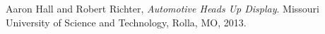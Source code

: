 \begin{thebibliography}{9}

	Aaron Hall and Robert Richter,
	\emph{Automotive Heads Up Display}.
	Missouri University of Science and Technology,
	Rolla, MO,
	2013.

\end{thebibliography}